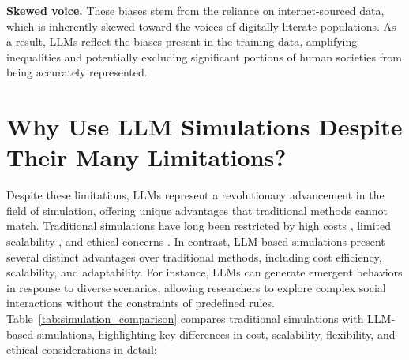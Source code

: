 \noindent
\textbf{Skewed voice.} These biases stem from the reliance on internet-sourced data, which is inherently skewed toward the voices of digitally literate populations. As a result, LLMs reflect the biases present in the training data, amplifying inequalities and potentially excluding significant portions of human societies from being accurately represented.


\section{Why Use LLM Simulations Despite Their Many Limitations?}
Despite these limitations, LLMs represent a revolutionary advancement in the field of simulation, offering unique advantages that traditional methods cannot match. Traditional simulations have long been restricted by high costs \citep{gaba2004future}, limited scalability \citep{buyya2009modeling}, and ethical concerns \citep{rokhshad2023artificial}. In contrast, LLM-based simulations present several distinct advantages over traditional methods, including cost efficiency, scalability, and adaptability. For instance, LLMs can generate emergent behaviors in response to diverse scenarios, allowing researchers to explore complex social interactions without the constraints of predefined rules. Table~\ref{tab:simulation_comparison} compares traditional simulations with LLM-based simulations, highlighting key differences in cost, scalability, flexibility, and ethical considerations in detail:

